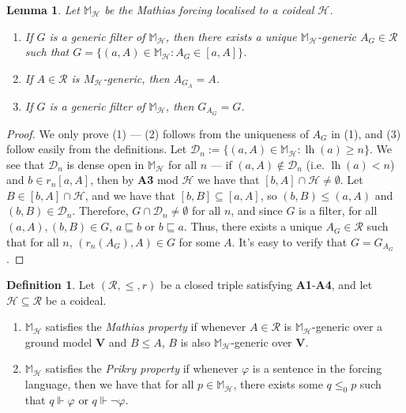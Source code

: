 \documentclass[11pt,reqno]{amsart}
\theoremstyle{plain}
\numberwithin{equation}{section}
\newtheorem{lemma}[theorem]{Lemma}
\theoremstyle{definition}
\newtheorem{definition}[theorem]{Definition}
\newcommand{\func}{\operatorname}
\newcommand{\cal}{\mathcal}
\renewcommand{\bf}{\mathbf}
\newcommand{\forces}{\Vdash}
\newcommand{\V}{\bf{V}}
\renewcommand{\H}{\cal{H}}
\newcommand{\lh}{\func{lh}}
\newcommand{\D}{\cal{D}}
\begin{document}
\begin{lemma}
    Let $\mathbb{M}_\H$ be the Mathias forcing localised to a coideal $\H$.
    \begin{enumerate}
        \item If $G$ is a generic filter of $\mathbb{M}_\H$, then there exists a unique $\mathbb{M}_\H$-generic $A_G \in \cal{R}$ such that $G = \{(a,A) \in \mathbb{M}_\H : A_G \in [a,A]\}$. 
        
        \item If $A \in \cal{R}$ is $M_\H$-generic, then $A_{G_A} = A$.
        
        \item If $G$ is a generic filter of $\mathbb{M}_\H$, then $G_{A_G} = G$.
    \end{enumerate}
\end{lemma}

\begin{proof}
    We only prove (1) --- (2) follows from the uniqueness of $A_G$ in (1), and (3) follow easily from the definitions. Let $\D_n := \{(a,A) \in \mathbb{M}_\H : \lh(a) \geq n\}$. We see that $\D_n$ is dense open in $\mathbb{M}_\H$ for all $n$ --- if $(a,A) \notin \D_n$ (i.e. $\lh(a) < n$) and $b \in r_n[a,A]$, then by \textbf{A3} mod $\H$ we have that $[b,A] \cap \H \neq \emptyset$. Let $B \in [b,A] \cap \H$, and we have that $[b,B] \subseteq [a,A]$, so $(b,B) \leq (a,A)$ and $(b,B) \in \D_n$. Therefore, $G \cap \D_n \neq \emptyset$ for all $n$, and since $G$ is a filter, for all $(a,A),(b,B) \in G$, $a \sqsubseteq b$ or $b \sqsubseteq a$. Thus, there exists a unique $A_G \in \cal{R}$ such that for all $n$, $(r_n(A_G),A) \in G$ for some $A$. It's easy to verify that $G = G_{A_G}$.
\end{proof} 

\begin{definition}
    Let $(\cal{R},\leq,r)$ be a closed triple satisfying \textbf{A1}-\textbf{A4}, and let $\H \subseteq \cal{R}$ be a coideal.
    \begin{enumerate}
        \item $\mathbb{M}_\H$ satisfies the \emph{Mathias property} if whenever $A \in \cal{R}$ is $\mathbb{M}_\H$-generic over a ground model $\V$ and $B \leq A$, $B$ is also $\mathbb{M}_\H$-generic over $\V$.
        
        \item $\mathbb{M}_\H$ satisfies the \emph{Prikry property} if whenever $\varphi$ is a sentence in the forcing language, then we have that for all $p \in \mathbb{M}_\H$, there exists some $q \leq_0 p$ such that $q \forces \varphi$ or $q \forces \neg\varphi$.
    \end{enumerate}
\end{definition}
\end{document}
